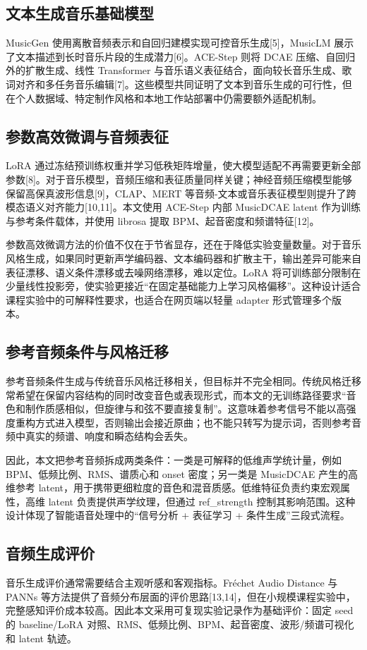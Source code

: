 \documentclass[UTF8,a4paper,zihao=-4,fontset=none]{ctexart}
\begin{document}
\subsection{文本生成音乐基础模型}
MusicGen 使用离散音频表示和自回归建模实现可控音乐生成[5]，MusicLM 展示了文本描述到长时音乐片段的生成潜力[6]。ACE-Step 则将 DCAE 压缩、自回归外的扩散生成、线性 Transformer 与音乐语义表征结合，面向较长音乐生成、歌词对齐和多任务音乐编辑[7]。这些模型共同证明了文本到音乐生成的可行性，但在个人数据域、特定制作风格和本地工作站部署中仍需要额外适配机制。

\subsection{参数高效微调与音频表征}
LoRA 通过冻结预训练权重并学习低秩矩阵增量，使大模型适配不再需要更新全部参数[8]。对于音乐模型，音频压缩和表征质量同样关键；神经音频压缩模型能够保留高保真波形信息[9]，CLAP、MERT 等音频-文本或音乐表征模型则提升了跨模态语义对齐能力[10,11]。本文使用 ACE-Step 内部 MusicDCAE latent 作为训练与参考条件载体，并使用 librosa 提取 BPM、起音密度和频谱特征[12]。

参数高效微调方法的价值不仅在于节省显存，还在于降低实验变量数量。对于音乐风格生成，如果同时更新声学编码器、文本编码器和扩散主干，输出差异可能来自表征漂移、语义条件漂移或去噪网络漂移，难以定位。LoRA 将可训练部分限制在少量线性投影旁，使实验更接近“在固定基础能力上学习风格偏移”。这种设计适合课程实验中的可解释性要求，也适合在网页端以轻量 adapter 形式管理多个版本。

\subsection{参考音频条件与风格迁移}
参考音频条件生成与传统音乐风格迁移相关，但目标并不完全相同。传统风格迁移常希望在保留内容结构的同时改变音色或表现形式，而本文的无训练路径要求“音色和制作质感相似，但旋律与和弦不要直接复制”。这意味着参考信号不能以高强度重构方式进入模型，否则输出会接近原曲；也不能只转写为提示词，否则参考音频中真实的频谱、响度和瞬态结构会丢失。

因此，本文把参考音频拆成两类条件：一类是可解释的低维声学统计量，例如 BPM、低频比例、RMS、谱质心和 onset 密度；另一类是 MusicDCAE 产生的高维参考 latent，用于携带更细粒度的音色和混音质感。低维特征负责约束宏观属性，高维 latent 负责提供声学纹理，但通过 ref\_strength 控制其影响范围。这种设计体现了智能语音处理中的“信号分析 + 表征学习 + 条件生成”三段式流程。

\subsection{音频生成评价}
音乐生成评价通常需要结合主观听感和客观指标。Fréchet Audio Distance 与 PANNs 等方法提供了音频分布层面的评价思路[13,14]，但在小规模课程实验中，完整感知评价成本较高。因此本文采用可复现实验记录作为基础评价：固定 seed 的 baseline/LoRA 对照、RMS、低频比例、BPM、起音密度、波形/频谱可视化和 latent 轨迹。
\end{document}
